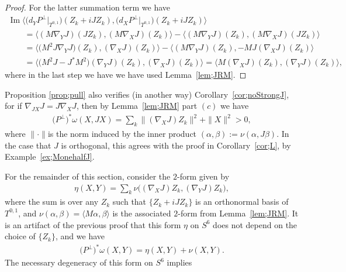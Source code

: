 \documentclass[10pt,a4paper]{amsart}
\numberwithin{equation}{section}
\begin{document}
\begin{proof}
For the latter summation term we have
\begin{gather*}
\operatorname{Im} \big\langle \big( d_Y P^\perp\big|_{T^{0,1}} \big) (Z_k + i J Z_k), \big( d_X P^\perp\big|_{T^{0,1}} \big) (Z_k + i J Z_k) \big\rangle\\
\qquad{} =\langle ( M \nabla_Y J ) (J Z_k), ( M \nabla_X J ) (Z_k ) \rangle
-\langle ( M \nabla_Y J ) (Z_k ), ( M \nabla_X J ) ( J Z_k) \rangle \\
\qquad{} =\big\langle \big( M^2J \nabla_Y J\big) ( Z_k), (\nabla_X J) (Z_k ) \big\rangle-
\langle ( M \nabla_Y J ) (Z_k ), -MJ (\nabla_X J) ( Z_k) \rangle \\
\qquad{} = \big\langle \big(M^2J-J^*M^2\big) ( \nabla_Y J ) ( Z_k), (\nabla_X J) (Z_k ) \big\rangle
=\langle M (\nabla_X J) ( Z_k), (\nabla_Y J) (Z_k ) \rangle ,
\end{gather*}
where in the last step we have we have used Lemma~\ref{lem;JRM}.
\end{proof}

\begin{rmk}Proposition \ref{prop;pull} also verifies (in another way) Corollary~\ref{cor;noStrongJ}, for if $\nabla_{JX} J = J \nabla_X J$, then by Lemma~\ref{lem;JRM} part $(c)$ we have
\begin{gather*}
\big(P^\perp\big)^*\omega(X,JX) = \sum_k \| (\nabla_X J) Z_k \|^2 + \|X\|^2 >0,
\end{gather*}
where $\|\cdot \|$is the norm induced by the inner product $( \alpha ,\beta ) := \nu (\alpha , J \beta)$. In the case that $J$ is orthogonal, this agrees with the proof in Corollary~\ref{cor;L}, by Example~\ref{ex;MonehalfJ}.
\end{rmk}

For the remainder of this section, consider the $2$-form given by
\begin{gather*}
\eta(X,Y) = \sum_k \nu \big( (\nabla_X J) Z_k, (\nabla_Y J) Z_k \big),
\end{gather*}
where the sum is over any $Z_k$ such that $\{Z_k + i J Z_k\}$ is an orthonormal basis of $T^{0,1}$, and $\nu(\alpha ,\beta) = \langle M \alpha, \beta \rangle$ is the associated $2$-form from Lemma~\ref{lem;JRM}. It is an artifact of the previous proof that this form $\eta$ on $S^6$ does not depend on the choice of $\{Z_k\}$, and we have
\begin{gather*}
\big(P^\perp\big)^*\omega(X,Y) =\eta(X,Y) + \nu ( X , Y ).
\end{gather*}
The necessary degeneracy of this form on $S^6$ implies
\end{document}
